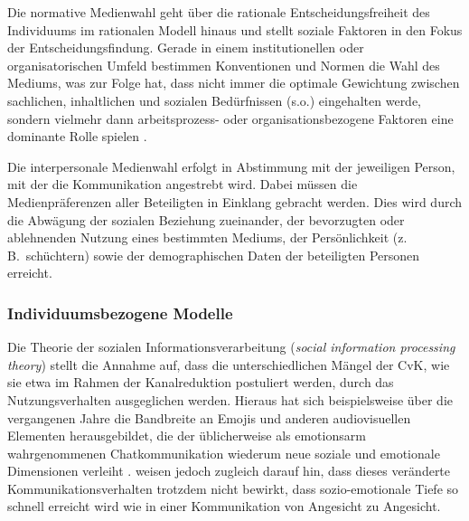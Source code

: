 \label{K2:para:normative-medienwahl}
Die normative Medienwahl geht über die rationale Entscheidungsfreiheit des Individuums im rationalen Modell hinaus \citep[426]{doring_c_2013} und stellt soziale Faktoren in den Fokus der Entscheidungsfindung. Gerade in einem institutionellen oder organisatorischen Umfeld bestimmen Konventionen und Normen die Wahl des Mediums, was zur Folge hat, dass nicht immer die optimale Gewichtung zwischen sachlichen, inhaltlichen und sozialen Bedürfnissen (s.o.) eingehalten werde, sondern vielmehr dann arbeitsprozess- oder organisationsbezogene Faktoren eine dominante Rolle spielen \citep[100\psq]{misoch_online-kommunikation_2006}.

\label{K2:para:interpersonale-medienwahl}
Die interpersonale Medienwahl erfolgt in Abstimmung mit der jeweiligen Person, mit der die Kommunikation angestrebt wird. Dabei müssen die Medienpräferenzen aller Beteiligten in Einklang gebracht werden. Dies wird durch die Abwägung der sozialen Beziehung zueinander, der bevorzugten oder ablehnenden Nutzung eines bestimmten Mediums, der Persönlichkeit (z.\,B.\ schüchtern) sowie der demographischen Daten der beteiligten Personen erreicht. \citep[108\psq]{misoch_online-kommunikation_2006}


\subsubsection{Individuumsbezogene Modelle}
\label{K2:subsubsec:individuumsbezogene-modelle}


\label{K2:para:soz-information}
Die Theorie der sozialen Informationsverarbeitung (\emph{social information processing theory}) stellt die Annahme auf, dass die unterschiedlichen Mängel der CvK, wie sie etwa im Rahmen der Kanalreduktion postuliert werden, durch das Nutzungsverhalten ausgeglichen werden. Hieraus hat sich beispielsweise über die vergangenen Jahre die Bandbreite an Emojis und anderen audiovisuellen Elementen herausgebildet, die der üblicherweise als emotionsarm wahrgenommenen Chatkommunikation wiederum neue soziale und emotionale Dimensionen verleiht \citep[171]{schweiger_sozialkontakte_2019}. \citet[162]{trepte_medienpsychologie_2012} weisen jedoch zugleich darauf hin, dass dieses veränderte Kommunikationsverhalten trotzdem nicht bewirkt, dass sozio-emotionale Tiefe so schnell erreicht wird wie in einer Kommunikation von Angesicht zu Angesicht.

